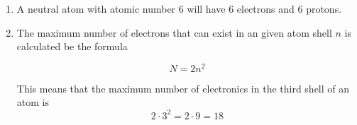 \documentclass[fleqn]{article}
\begin{document}
\begin{enumerate}[label=\textbf{\arabic*.}]

\item A neutral atom with atomic number 6 will have 6 electrons and 6 protons. 
  
\item The maximum number of electrons that can exist in an given atom shell $ n $ is calculated be the formula

\[
  N = 2n^2
\]

This means that the maximum number of electronics in the third shell of an atom is
\[ 
  2 \cdot 3^2 = 2 \cdot 9 = 18
\]
  
\end{enumerate}
\end{document}
